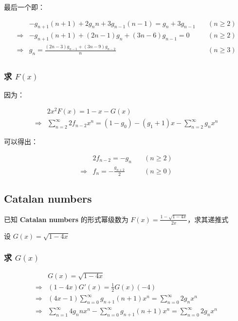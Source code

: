 \documentclass[UTF8]{article}
\begin{document}
最后一个即：

$$
\begin{aligned}
&-g_{n+1}(n+1)+2g_nn+3g_{n-1}(n-1)=g_{n}+3g_{n-1} \quad & (n \ge 2) \\
\Rightarrow &-g_{n+1}(n+1)+(2n-1)g_n+(3n-6)g_{n-1}=0 \quad & (n \ge 2) \\
\Rightarrow &g_n=\frac{(2n-3)g_{n-1}+(3n-9)g_{n-2}}{n} \quad & (n \ge 3) \\
\end{aligned}
$$

\subsubsection{求 $F(x)$}

因为：

$$
\begin{aligned}
&2x^2F(x)=1-x-G(x) \\
\Rightarrow &\sum_{n=2}^{\infty}2f_{n-2}x^n=(1-g_0)-(g_1+1)x-\sum_{n=2}^{\infty}g_nx^n
\end{aligned}
$$

可以得出：

$$
\begin{aligned}
&2f_{n-2}=-g_n \quad & (n \ge 2) \\
\Rightarrow &f_{n}=-\frac{g_{n+2}}{2} \quad & (n \ge 0)
\end{aligned}
$$

\subsection{Catalan numbers}

已知 \textbf{Catalan numbers} 的形式幂级数为 $F(x)=\frac{1-\sqrt{1-4x}}{2x}$，求其递推式

设 $G(x)=\sqrt{1-4x}$

\subsubsection{求 $G(x)$}

$$
\begin{aligned}
&G(x)=\sqrt{1-4x} \\
\Rightarrow &(1-4x)G'(x)=\frac{1}{2}G(x)(-4) \\
\Rightarrow &(4x-1)\sum_{n=0}^{\infty}g_{n+1}(n+1)x^n=\sum_{n=0}^{\infty}2g_nx^n \\
\Rightarrow &\sum_{n=1}^{\infty}4g_{n}nx^n-\sum_{n=0}^{\infty}g_{n+1}(n+1)x^n=\sum_{n=0}^{\infty}2g_nx^n \\
\end{aligned}
$$
\end{document}
